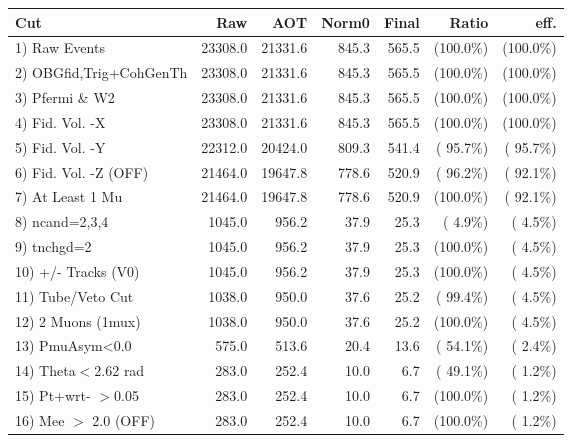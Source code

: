  \begin{table}[h!]\centering
 \begin{tabular}{||l||r|r|r|r|r|r||}
 \hline
 \hline
 Cut & Raw & AOT & Norm0 & Final & Ratio & eff.       \\
 \hline
  1) Raw Events           &      23308.0 &      21331.6 &        845.3 &        565.5 & (100.0\%) & (100.0\%) \\
  2) OBGfid,Trig+CohGenTh &      23308.0 &      21331.6 &        845.3 &        565.5 & (100.0\%) & (100.0\%) \\
  3) Pfermi \& W2         &      23308.0 &      21331.6 &        845.3 &        565.5 & (100.0\%) & (100.0\%) \\
  4) Fid. Vol. -X         &      23308.0 &      21331.6 &        845.3 &        565.5 & (100.0\%) & (100.0\%) \\
  5) Fid. Vol. -Y         &      22312.0 &      20424.0 &        809.3 &        541.4 & ( 95.7\%) & ( 95.7\%) \\
  6) Fid. Vol. -Z (OFF)   &      21464.0 &      19647.8 &        778.6 &        520.9 & ( 96.2\%) & ( 92.1\%) \\
  7) At Least 1 Mu        &      21464.0 &      19647.8 &        778.6 &        520.9 & (100.0\%) & ( 92.1\%) \\
  8) ncand=2,3,4          &       1045.0 &        956.2 &         37.9 &         25.3 & (  4.9\%) & (  4.5\%) \\
  9) tnchgd=2             &       1045.0 &        956.2 &         37.9 &         25.3 & (100.0\%) & (  4.5\%) \\
 10) +/- Tracks (V0)      &       1045.0 &        956.2 &         37.9 &         25.3 & (100.0\%) & (  4.5\%) \\
 11) Tube/Veto Cut        &       1038.0 &        950.0 &         37.6 &         25.2 & ( 99.4\%) & (  4.5\%) \\
 12) 2 Muons (1mux)       &       1038.0 &        950.0 &         37.6 &         25.2 & (100.0\%) & (  4.5\%) \\
 13) PmuAsym<0.0          &        575.0 &        513.6 &         20.4 &         13.6 & ( 54.1\%) & (  2.4\%) \\
 14) Theta$<$2.62 rad     &        283.0 &        252.4 &         10.0 &          6.7 & ( 49.1\%) & (  1.2\%) \\
 15) Pt+wrt- $>$0.05      &        283.0 &        252.4 &         10.0 &          6.7 & (100.0\%) & (  1.2\%) \\
 16) Mee $>$ 2.0  (OFF)   &        283.0 &        252.4 &         10.0 &          6.7 & (100.0\%) & (  1.2\%) \\

\end{tabular}
\end{table}
